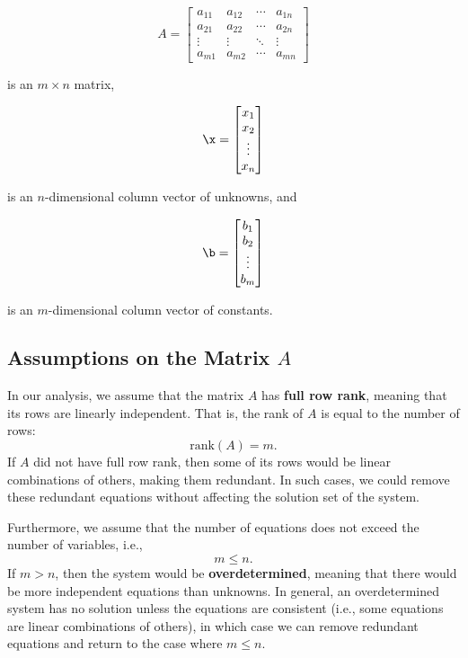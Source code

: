 \[
A =
\begin{bmatrix}
    a_{11} & a_{12} & \cdots & a_{1n} \\
    a_{21} & a_{22} & \cdots & a_{2n} \\
    \vdots & \vdots & \ddots & \vdots \\
    a_{m1} & a_{m2} & \cdots & a_{mn}
\end{bmatrix}
\]

is an \( m \times n \) matrix, 

\[
\x =
\begin{bmatrix}
    x_1 \\
    x_2 \\
    \vdots \\
    x_n
\end{bmatrix}
\]

is an \( n \)-dimensional column vector of unknowns, and

\[
\b =
\begin{bmatrix}
    b_1 \\
    b_2 \\
    \vdots \\
    b_m
\end{bmatrix}
\]

is an \( m \)-dimensional column vector of constants.

\subsection*{Assumptions on the Matrix \( A \)}

In our analysis, we assume that the matrix \( A \) has \textbf{full row rank}, meaning that its rows are linearly independent. That is, the rank of \( A \) is equal to the number of rows:
\[
\text{rank}(A) = m.
\]
If \( A \) did not have full row rank, then some of its rows would be linear combinations of others, making them redundant. In such cases, we could remove these redundant equations without affecting the solution set of the system.

Furthermore, we assume that the number of equations does not exceed the number of variables, i.e.,
\[
m \leq n.
\]
If \( m > n \), then the system would be \textbf{overdetermined}, meaning that there would be more independent equations than unknowns. In general, an overdetermined system has no solution unless the equations are consistent (i.e., some equations are linear combinations of others), in which case we can remove redundant equations and return to the case where \( m \leq n \).

